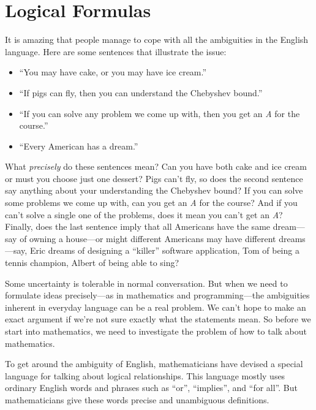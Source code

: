\chapter{Logical Formulas}\label{logicform_chap}

It is amazing that people manage to cope with all the ambiguities in the
English language.  Here are some sentences that illustrate the issue:
%
\begin{itemize}
\item ``You may have cake, or you may have ice cream.''
\item ``If pigs can fly, then you can understand the Chebyshev bound.''
\item ``If you can solve any problem we come up with, then you get an
  \emph{A} for the course.''
\item ``Every American has a dream.''
\end{itemize}
%
What \emph{precisely} do these sentences mean?  Can you have both cake and
ice cream or must you choose just one dessert?  Pigs can't fly, so does
the second sentence say anything about your understanding the Chebyshev
bound? If you can solve some problems we come up with, can you get an
\emph{A} for the course?  And if you can't solve a single one of the
problems, does it mean you can't get an \emph{A}?  Finally, does the last
sentence imply that all Americans have the same dream---say of owning a
house---or might different Americans may  have
different dreams---say, Eric dreams of designing a ``killer'' software
application, Tom of being a tennis champion, Albert of being able to sing?

Some uncertainty is tolerable in normal conversation.  But when we need to
formulate ideas precisely---as in mathematics and programming---the
ambiguities inherent in everyday language can be a real problem.  We can't
hope to make an exact argument if we're not sure exactly what the
statements mean.  So before we start into mathematics, we need to
investigate the problem of how to talk about mathematics.

To get around the ambiguity of English, mathematicians have devised a
special language for talking about logical relationships.  This language
mostly uses ordinary English words and phrases such as ``or'',
``implies'', and ``for all''.  But mathematicians give these words precise
and unambiguous definitions.  \iffalse A pitfall to watch out for is
confusing ordinary language with mathematical language that sounds
ordinary but isn't.\fi

